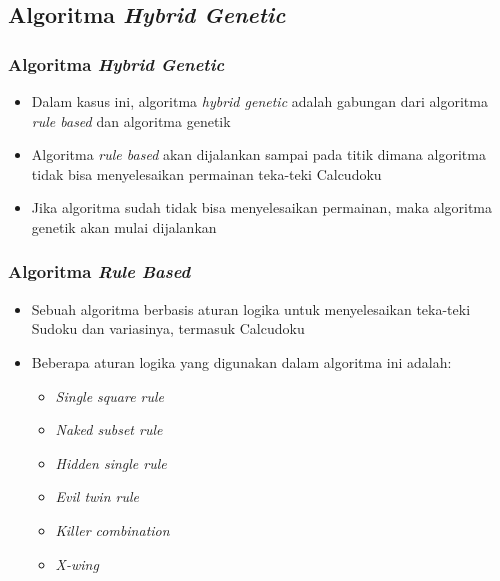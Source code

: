 \documentclass{beamer}
\begin{document}
\subsection{Algoritma \protect\textit{Hybrid Genetic}}

\begin{frame}
\frametitle{Algoritma \textit{Hybrid Genetic}}
\begin{itemize}
\item Dalam kasus ini, algoritma \textit{hybrid genetic} adalah gabungan dari algoritma \textit{rule based} dan algoritma genetik
\item Algoritma \textit{rule based} akan dijalankan sampai pada titik dimana algoritma tidak bisa menyelesaikan permainan teka-teki Calcudoku
\item Jika algoritma sudah tidak bisa menyelesaikan permainan, maka algoritma genetik akan mulai dijalankan
\end{itemize}
\end{frame}


\begin{frame}
\frametitle{Algoritma \textit{Rule Based}}
\begin{itemize}
\item Sebuah algoritma berbasis aturan logika untuk menyelesaikan teka-teki Sudoku dan variasinya, termasuk Calcudoku
\item Beberapa aturan logika yang digunakan dalam algoritma ini adalah:
	\begin{itemize}
 	\item \textit{Single square rule}
	\item \textit{Naked subset rule}
	\item \textit{Hidden single rule}
	\item \textit{Evil twin rule}
	\item \textit{Killer combination}
	\item \textit{X-wing}
	\end{itemize}
\end{itemize}
\end{frame}

\end{document}
